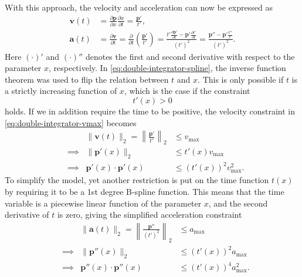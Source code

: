 With this approach, the velocity and acceleration can now be expressed as
\begin{subequations}\label{eq:double-integrator-spline}
    \begin{align}
        \mathbf{v}(t) &= \frac{\partial \mathbf{p}}{\partial x} \frac{\partial x}{\partial t} = \frac{\mathbf{p}'}{t'},
        \label{eq:double-integrator-v-spline} \\
        \mathbf{a}(t) &= \frac{\partial \mathbf{v}}{\partial t} = \frac{\partial}{\partial t} \left(\frac{\mathbf{p}'}{t'}\right) = 
        \frac{
            t'\frac{\partial \mathbf{p}'}{\partial t} - \mathbf{p}'\frac{\partial t'}{\partial t}
            }{(t')^2} = 
        \frac{\mathbf{p}'' - \mathbf{p}'\frac{t''}{t'}}{(t')^2}.
        \label{eq:double-integrator-a-spline}
    \end{align}
\end{subequations}
Here $(\cdot)'$ and $(\cdot)''$ denotes the first and second derivative with respect to the parameter $x$, respectively. In \cref{eq:double-integrator-spline}, the inverse function theorem was used to flip the relation between $t$ and $x$. This is only possible if $t$ is a strictly increasing function of $x$, which is the case if the constraint 
\begin{equation}\label{eq:constraint-t}
    t'(x) > 0
\end{equation}
holds.  
If we in addition require the time to be positive, the velocity constraint in \cref{eq:double-integrator-vmax} becomes
\begin{equation}\label{eq:double-integrator-vmax-spline}
    \begin{aligned}
        &&\|\mathbf{v}(t)\|_2 = \left\|\frac{\mathbf{p}'}{t'}\right\|_2 &\leq v_{\max} \\
        &\implies& \|\mathbf{p}'(x)\|_2 &\leq t'(x)v_{\max} \\
        &\implies& \mathbf{p}'(x)\cdot\mathbf{p}'(x) &\leq (t'(x))^2v_{\max}^2.
    \end{aligned}
\end{equation}
To simplify the model, yet another restriction is put on the time function $t(x)$ by requiring it to be a 1st degree B-spline function. This means that the time variable is a piecewise linear function of the parameter $x$, and the second derivative of $t$ is zero, giving the simplified acceleration constraint
\begin{equation}\label{eq:double-integrator-a-spline-simplified}
    \begin{aligned}
        &&\|\mathbf{a}(t)\|_2 = \left\|\frac{\mathbf{p}''}{(t')^2}\right\|_2 &\leq a_{\max} \\
        &\implies& \|\mathbf{p}''(x)\|_2 &\leq (t'(x))^2a_{\max} \\
        &\implies& \mathbf{p}''(x)\cdot\mathbf{p}''(x) &\leq (t'(x))^4a_{\max}^2.
    \end{aligned}
\end{equation}

